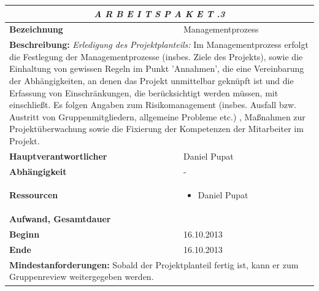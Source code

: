 \documentclass[fontsize=12pt,paper=a4,twoside]{scrartcl}
\begin{document}
\begin{tabular}{p{7.5cm}|p{7.5cm}}\toprule
\multicolumn{2}{c}{\textbf{\textit{A R B E I T S P A K E T \quad 1.1.3}}} \\ \toprule \hline
\textbf{Bezeichnung} & Managementprozess\\\hline
\multicolumn{2}{p{15cm}}{\textbf{Beschreibung:} \newline 
\textit{Erledigung des Projektplanteils:} Im Managementprozess erfolgt die Festlegung der Managementprozesse (insbes. Ziele des Projekts), sowie die Einhaltung von gewissen Regeln im Punkt 'Annahmen', die eine Vereinbarung der Abhängigkeiten, an denen das Projekt unmittelbar geknüpft ist und die Erfassung von Einschränkungen, die berücksichtigt werden müssen, mit einschließt. Es folgen Angaben zum Risikomanagement (insbes. Ausfall bzw. Austritt von Gruppenmitgliedern, allgemeine Probleme etc.) , Maßnahmen zur Projektüberwachung sowie die Fixierung der Kompetenzen der Mitarbeiter im Projekt.  }  \\\hline
\textbf{Hauptverantwortlicher} & Daniel Pupat\\\hline
\textbf{Abhängigkeit} & -\\\hline
\textbf{Ressourcen} & \begin{itemize}
\itemsep0pt
\item Daniel Pupat
\end{itemize} \\\hline
\textbf{Aufwand, Gesamtdauer} & \\\hline
\textbf{Beginn} & 16.10.2013 \\\hline
\textbf{Ende} & 16.10.2013\\\hline
\multicolumn{2}{p{15cm}}{\textbf{Mindestanforderungen: } \newline
Sobald der Projektplanteil fertig ist, kann er zum Gruppenreview weitergegeben werden. }  \\ \toprule
\end{tabular} \\\\
\end{document}
